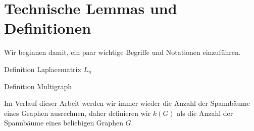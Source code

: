\graphicspath{{grafiken/tLuD/}}

\section{Technische Lemmas und Definitionen}
Wir beginnen damit, ein paar wichtige Begriffe und Notationen einzuführen.
\begin{Df}
Definition Laplacematrix $L_n$
\end{Df}

\begin{Dfs}
 Definition Multigraph
\end{Dfs}
Im Verlauf dieser Arbeit werden wir immer wieder die Anzahl der Spannbäume eines Graphen ausrechnen, daher definieren wir $\mathit{k}(G)$ als die Anzahl der Spannbäume eines beliebigen Graphen $G$.
